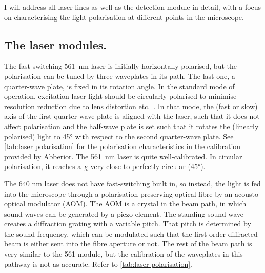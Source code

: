 I will address all laser lines as well as the detection module in detail, with a focus on characterising the light polarisation at different points in the microscope.

\subsection{The laser modules.} The fast-switching 561~nm laser is initially horizontally polarised, but the polarisation can be tuned by three waveplates in its path. The last one, a quarter-wave plate, is fixed in its rotation angle. In the standard mode of operation, excitation laser light should be circularly polarised to minimise resolution reduction due to lens distortion etc.~\cite{Harke2008}. In that mode, the (fast or slow) axis of the first quarter-wave plate is aligned with the laser, such that it does not affect polarisation and the half-wave plate is set such that it rotates the (linearly polarised) light to \ang{45} with respect to the second quarter-wave plate. See \autoref{tab:laser polarisation} for the polarisation characteristics in the calibration provided by Abberior. The 561~nm laser is quite well-calibrated. In circular polarisation, it reaches a $ \chi $ very close to perfectly circular (\ang{45}).

The 640 nm laser does not have fast-switching built in, so instead, the light is fed into the microscope through a polarisation-preserving optical fibre by an acousto-optical modulator (AOM). The AOM is a crystal in the beam path, in which sound waves can be generated by a piezo element. The standing sound wave creates a diffraction grating with a variable pitch. That pitch is determined by the sound frequency, which can be modulated such that the first-order diffracted beam is either sent into the fibre aperture or not. The rest of the beam path is very similar to the 561 module, but the calibration of the waveplates in this pathway is not as accurate. Refer to \autoref{tab:laser polarisation}. 

